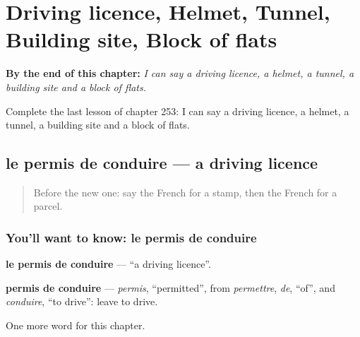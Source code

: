 
\chapter{Driving licence, Helmet, Tunnel, Building site, Block of flats}
\label{ch:fr-driving-licence-helmet-tunnel-building-site-block-of-flats}

\begin{chapteropening}
\textbf{By the end of this chapter:} \emph{I can say a driving licence, a helmet, a tunnel, a building site and a block of flats.}

Complete the last lesson of chapter 253: I can say a driving licence, a helmet, a tunnel, a building site and a block of flats.
\end{chapteropening}

\section[le permis de conduire]{le permis de conduire — a driving licence}

\label{lesson:FR-C253-permis-de-conduire}



\begin{quote}
Before the new one: say the French for a stamp, then the French for a parcel.
\end{quote}

\subsection*{You'll want to know: le permis de conduire}
\textbf{le permis de conduire} — \textquotedblleft{}a driving licence\textquotedblright{}.

\begin{cousinweb}
\textbf{permis de conduire} — \emph{permis}, \textquotedblleft{}permitted\textquotedblright{}, from \emph{permettre}, \emph{de}, \textquotedblleft{}of\textquotedblright{}, and \emph{conduire}, \textquotedblleft{}to drive\textquotedblright{}: leave to drive.
\end{cousinweb}

\begin{grammarlens}[title={What you've built}]
One more word for this chapter.
\end{grammarlens}

